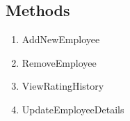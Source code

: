 \documentclass[10 pm]{article}
\begin{document}
\subsection{Methods}
\begin{enumerate}
\item AddNewEmployee
\item RemoveEmployee
\item ViewRatingHistory
\item UpdateEmployeeDetails
\end{enumerate}
\end{document}
